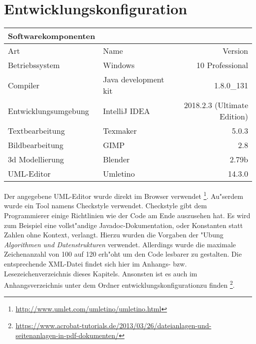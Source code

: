 \section{Entwicklungskonfiguration}
\label{sec:entwicklungskonfiguration}
\begin{table}[h!]
	\begin{tabular}{llr} 
	\toprule
	Softwarekomponenten\\  
	\midrule 
	Art & Name & Version\\ 
	\midrule 
	Betriebssystem & Windows & 10 Professional\\ 
	Compiler & Java development kit & 1.8.0\_131\\
  Entwicklungsumgebung & IntelliJ IDEA & 2018.2.3 (Ultimate Edition)\\
  Textbearbeitung & Texmaker & 5.0.3\\
  Bildbearbeitung & GIMP & 2.8\\
  3d Modellierung & Blender & 2.79b\\
  UML-Editor & Umletino & 14.3.0\\
	\bottomrule
	\end{tabular}
	\label{tab:ablaufbedingungen}
\end{table}
Der angegebene UML-Editor wurde direkt im Browser verwendet 
\footnote{\url{http://www.umlet.com/umletino/umletino.html}}. 
Au"serdem wurde ein Tool namens Checkstyle verwendet. Checkstyle gibt dem Programmierer einige 
Richtlinien wie der Code am Ende auszusehen hat. Es wird zum Beispiel eine vollst"andige Javadoc-Dokumentation, oder Konstanten statt Zahlen ohne Kontext, verlangt. Hierzu wurden die Vorgaben der "Ubung 
\emph{Algorithmen und Datenstrukturen} verwendet. Allerdings wurde die maximale Zeichenanzahl von 100 auf 120 erh"oht um den Code lesbarer zu gestalten. Die entsprechende XML-Datei findet sich hier im Anhangs- bzw. Lesezeichenverzeichnis dieses Kapitels. Ansonsten ist es auch im Anhangsverzeichnis unter dem Ordner \glqq entwicklungskonfiguration\grqq zu finden
\footnote{\url{https://www.acrobat-tutorials.de/2013/03/26/dateianlagen-und-seitenanlagen-in-pdf-dokumenten/}}.

